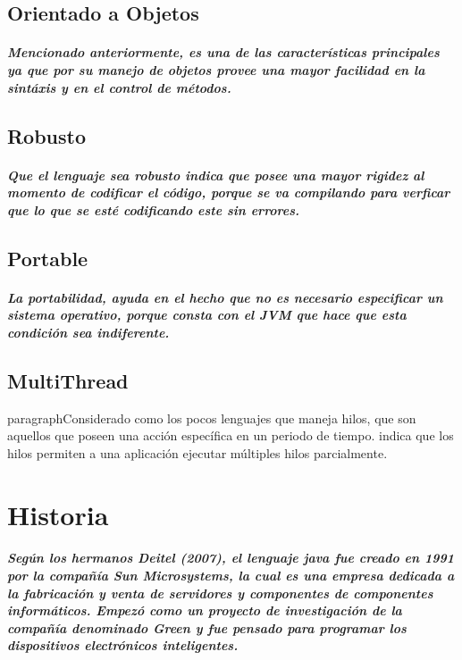 \documentclass[12pt]{book} %
\begin{document}
\section{Orientado a Objetos}
\paragraph{Mencionado anteriormente, es una de las caracter\'isticas principales ya que por su manejo de objetos provee una mayor facilidad en la sint\'axis y en el control de m\'etodos.}
\section{Robusto}
\paragraph{Que el lenguaje sea robusto indica que posee una mayor rigidez al momento de codificar el c\'odigo, porque se va compilando para verficar que lo que se est\'e codificando este sin errores.}
\section{Portable}
\paragraph{La portabilidad, ayuda en el hecho que no es necesario especificar un sistema operativo, porque consta con el JVM que hace que esta condici\'on sea indiferente.}
\section{MultiThread}
paragraph{Considerado como los pocos lenguajes que maneja hilos, que son aquellos que poseen una acci\'on espec\'ifica en un periodo de tiempo. \cite{thread} indica que los hilos permiten a una aplicaci\'on ejecutar m\'ultiples hilos parcialmente.}

\chapter{Historia}
\paragraph{Según los hermanos Deitel (2007), el lenguaje java fue creado en 1991 por la compañía Sun Microsystems, la cual es una empresa dedicada a la fabricación y venta de servidores y componentes de componentes informáticos. Empezó como un proyecto de investigación de la compañía denominado Green y fue pensado para programar los dispositivos electrónicos inteligentes.}
\end{document}
